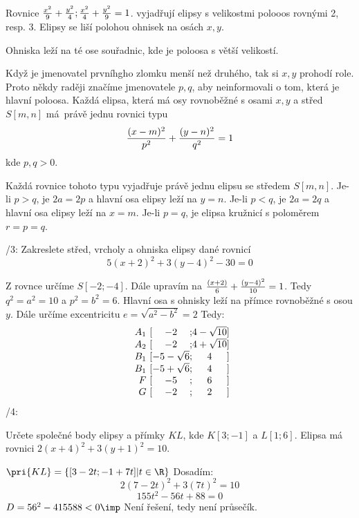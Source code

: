 \Poz
Rovnice $\frac{x^2}9+\frac{y^2}4 ; \frac{x^2}4 + \frac{y^2}9 = 1$. vyjadřují elipsy s velikostmi polooos rovnými 2, resp. 3.
Elipsy se liší polohou ohnisek na osách $x,y$.

Ohniska leží na té ose souřadnic, kde je poloosa s větší velikostí.

\Poz
Když je jmenovatel prvníhgho zlomku menší než druhého, tak si $x,y$ prohodí role.
\Poz
Proto někdy raději značíme jmenovatele $p,q$, aby neinformovali o tom, která je hlavní poloosa.
Každá elipsa, která má osy rovnoběžné s osami $x,y$ a střed $S[m,n]$ má právě jednu rovnici typu
$$ \frac{(x-m)^2}{p^2} + \frac{(y-n)^2}{q^2} = 1$$
kde $p,q>0$.

\V Každá rovnice tohoto typu vyjadřuje právě jednu elipsu se středem $S[m,n]$.
Je-li $p>q$, je $2a = 2p$ a hlavní osa elipsy leží na $y=n$.
Je-li $p<q$, je $2a = 2q$ a hlavní osa elipsy leží na $x=m$.
Je-li $p=q$, je elipsa kružnicí s poloměrem $r=p=q$.

/3:
Zakreslete střed, vrcholy a ohniska elipsy dané rovnicí
$$ 5(x+2)^2 + 3(y-4)^2 - 30 =0 $$

Z rovnce určíme $S[-2;-4]$. Dále upravím na $\frac{(x+2)}6 + \frac{(y-4)^2}{10} = 1$.
Tedy $q^2 = a^2 = 10$ a $p^2 = b^2 = 6$. Hlavní osa s ohnisky leží na přímce rovnoběžné s osou $y$. Dále určíme excentricitu $e = \sqrt{a^2 - b^2} = 2$
Tedy:
$$
\begin{array}{r@{\ [}c@{;}c@{]}}
	A_1 & -2 & 4-\sqrt{10}\\
	A_2 & -2 & 4+\sqrt{10}\\
	B_1 & -5-\sqrt 6 & 4 \\
	B_1 & -5+\sqrt 6 & 4 \\
	F&-5&6\\
	G&-2&2\\
\end{array}
$$
/4:

Určete společné body elipsy a přímky $KL$, kde $K[3;-1]$ a $L[1;6]$.
Elipsa má rovnici $2(x+4)^2 + 3(y+1)^2 = 10$.

$\pri{KL} = \zs{[3-2t;-1+7t]|t\in\R}$
Dosadím:
$$2(7-2t)^2 + 3 (7t)^2 = 10$$
$$155t^2 - 56t+88 = 0$$
$D = 56^2 - 4\* 155 \* 88 < 0 \imp $ Není řešení, tedy není průsečík.

